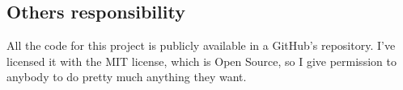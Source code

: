 \documentclass{article}
\begin{document}
    \subsection{Others responsibility}
    All the code for this project is publicly available in a GitHub's repository.
    I've licensed it with the MIT license, which is Open Source, so I give
    permission to anybody to do pretty much anything they want.




%
%
%
%
%
\end{document}
